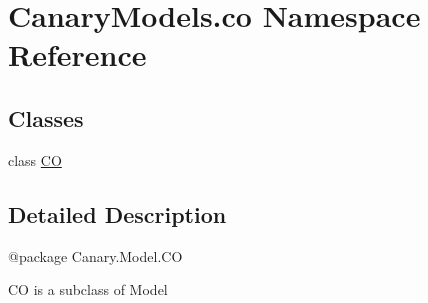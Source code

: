 \hypertarget{namespace_canary_models_1_1co}{\section{Canary\-Models.\-co Namespace Reference}
\label{namespace_canary_models_1_1co}
}
\subsection*{Classes}
\begin{DoxyCompactItemize}
\item 
class \hyperlink{class_canary_models_1_1co_1_1_c_o}{C\-O}
\end{DoxyCompactItemize}


\subsection{Detailed Description}
\begin{DoxyVerb}@package Canary.Model.CO

CO is a subclass of Model
\end{DoxyVerb}
 